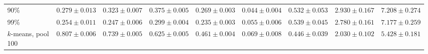 \begin{table}[t]
{\begin{tabular}{l cccc cccc}
90\% & $0.279 \pm {\scriptstyle 0.013}$ & $0.323 \pm {\scriptstyle 0.007}$ & $0.375 \pm {\scriptstyle 0.005}$ & $0.269 \pm {\scriptstyle 0.003}$ & $0.044 \pm {\scriptstyle 0.004}$ & $0.532 \pm {\scriptstyle 0.053}$ & $2.930 \pm {\scriptstyle 0.167}$ & $7.208 \pm {\scriptstyle 0.274}$ \\
99\% & $0.254 \pm {\scriptstyle 0.011}$ & $0.247 \pm {\scriptstyle 0.006}$ & $0.299 \pm {\scriptstyle 0.004}$ & $0.235 \pm {\scriptstyle 0.003}$ & $0.055 \pm {\scriptstyle 0.006}$ & $0.539 \pm {\scriptstyle 0.045}$ & $2.780 \pm {\scriptstyle 0.161}$ & $7.177 \pm {\scriptstyle 0.259}$ \\
\midrule
$k$-means, pool 100 & $\bm{0.807} \pm {\scriptstyle 0.006}$ & $\bm{0.739} \pm {\scriptstyle 0.005}$ & $\bm{0.625} \pm {\scriptstyle 0.005}$ & $\bm{0.461} \pm {\scriptstyle 0.004}$ & $\bm{0.069} \pm {\scriptstyle 0.008}$ & $\bm{0.446} \pm {\scriptstyle 0.039}$ & $\bm{2.030} \pm {\scriptstyle 0.102}$ & $\bm{5.428} \pm {\scriptstyle 0.181}$ \\
\bottomrule
\end{tabular}
}
\end{table}
